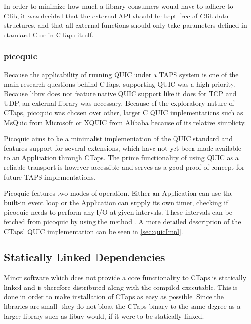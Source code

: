 In order to minimize how much a library consumers would have to
adhere to Glib, it was decided that the external API should be
kept free of Glib data structures, and that all external functions
should only take parameters defined in standard C or in CTaps itself.

\subsubsection{picoquic} \label{sec:picoquic}
Because the applicability of running QUIC under a TAPS system is one of
the main research questions behind CTaps, supporting QUIC was a high
priority. Because libuv does not feature native QUIC support like it
does for TCP and UDP, an external library was necessary. Because of
the exploratory nature of CTaps, picoquic \cite{christianhuitemaPicoquic} was chosen over other, larger
C QUIC implementations such as MsQuic \cite{MsQuic} from Microsoft or XQUIC \cite{XQUIC} from Alibaba 
because of its relative simplicty.

Picoquic aims to be a minimalist implementation of the QUIC standard
and features support for several extensions, which have not yet
been made available to an Application through CTaps. The prime
functionality of using QUIC as a reliable transport is however
accessible and serves as a good proof of concept for future TAPS
implementations.

Picoquic features two modes of operation. Either an Application can
use the built-in event loop  or the
Application can supply its own timer, checking if picoquic needs
to perform any I/O at given intervals. These intervals can be fetched
from picoquic by using the method .
A more detailed description of the CTaps' QUIC implementation can be
seen in \cref{sec:quicImpl}.

\subsection{Statically Linked Dependencies}
Minor software which does not provide a core functionality to CTaps
is statically linked and is therefore distributed along with the
compiled executable. 
This is done in order to make installation of
CTaps as easy as possible. Since the libraries are small, they
do not bloat the CTaps binary to the same degree as a larger library
such as libuv would, if it were to be statically linked.

